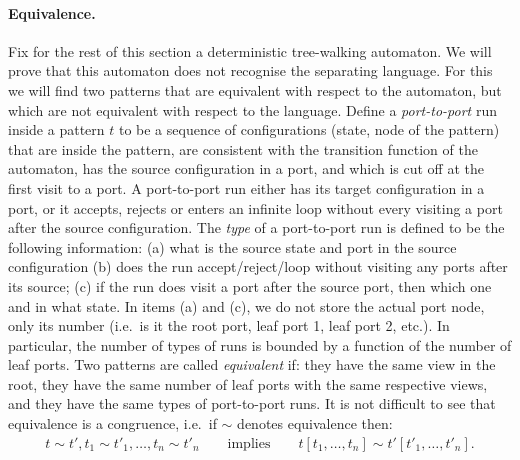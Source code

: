 \paragraph*{Equivalence.} Fix for the rest of this section a deterministic tree-walking automaton. We will prove that this automaton does not recognise the separating language. For this we will find two patterns that are equivalent with respect to the automaton, but which are not equivalent with respect to the language. Define a \emph{port-to-port} run  inside a pattern $t$ to be a sequence of configurations (state, node of the pattern) that are inside the pattern, are consistent with the transition function of the automaton, has the source configuration in a port, and which is cut off at the first visit to a port.  A port-to-port run either has its target configuration in  a port, or it accepts, rejects or enters an infinite loop without every visiting a port after the source configuration.
 The \emph{type} of a port-to-port run  is defined to be the following information: (a) what is the source state and port in the source configuration (b) does the run accept/reject/loop without visiting any ports after its source; (c) if the run does  visit  a port after the source port, then which one and in what state. In items (a) and (c), we do not store the actual port node, only its number (i.e.~is it the root port, leaf port 1, leaf port 2, etc.). In particular, the number of types of runs is bounded by a function of the number of leaf ports. Two patterns are called \emph{equivalent} if: they have the same view in the root, they have the same number of leaf ports with the same respective views, and they have  the same types of port-to-port runs. It is not difficult to see that equivalence  is a congruence, i.e.~if $\sim$ denotes equivalence then:
\begin{align*}
	t \sim t', t_1 \sim t'_1,\ldots, t_n \sim t'_n \qquad \text{implies} \qquad t[t_1,\ldots,t_n] \sim t'[t'_1,\ldots,t'_n].
\end{align*}


